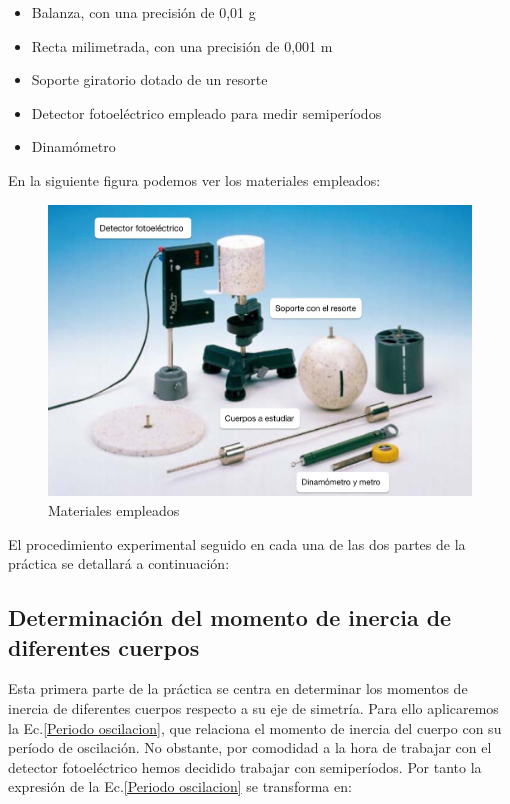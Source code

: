 \documentclass[a4paper,12pt,titlepage]{report}
\begin{document}
\begin{itemize}
    \item Balanza, con una precisión de 0,01 g
    \item Recta milimetrada, con una precisión de 0,001 m
    \item Soporte giratorio dotado de un resorte
    \item Detector fotoeléctrico empleado para medir semiperíodos
    \item Dinamómetro
\end{itemize}

En la siguiente figura podemos ver los materiales empleados:

\begin{figure}[h!]
    \centering
    \includegraphics[width=0.75\linewidth]{Images/Material MI-1.jpg}
    \caption{Materiales empleados}
\end{figure}

\newpage

El procedimiento experimental seguido en cada una de las dos partes de la práctica se detallará a continuación:

\subsection{Determinación del momento de inercia de diferentes cuerpos}

Esta primera parte de la práctica se centra en determinar los momentos de inercia de diferentes cuerpos respecto a su eje de simetría. Para ello aplicaremos la Ec.\ref{Periodo oscilacion}, que relaciona el momento de inercia del cuerpo con su período de oscilación. No obstante, por comodidad a la hora de trabajar con el detector fotoeléctrico hemos decidido trabajar con semiperíodos. Por tanto la expresión de la Ec.\ref{Periodo oscilacion} se transforma en:
\end{document}
